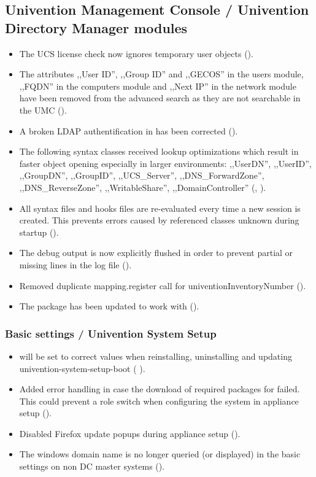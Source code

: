 \subsection{Univention Management Console / Univention Directory Manager modules}
\begin{itemize}
\item The UCS license check now ignores temporary user objects ().
\item The attributes ,,User ID'', ,,Group ID'' and ,,GECOS'' in the users module, ,,FQDN'' in the computers
  module and ,,Next IP'' in the network module have been removed from the advanced search as they
  are not searchable in the UMC ().
\item A broken LDAP authentification in  has been corrected ().
\item The following syntax classes received lookup optimizations
  which result in faster object opening especially in larger environments:
  ,,UserDN'', ,,UserID'', ,,GroupDN'', ,,GroupID'', ,,UCS\_Server'',
  ,,DNS\_ForwardZone'', ,,DNS\_ReverseZone'', ,,WritableShare'',
  ,,DomainController'' (, ).
\item All syntax files and hooks files are re-evaluated every time a new
  session is created. This prevents errors caused by referenced classes unknown
  during  startup
  ().
\item The debug output is now explicitly flushed in order to prevent
  partial or missing lines in the log file ().
\item Removed duplicate mapping.register call for univentionInventoryNumber ().
\item The package  has been updated to work with  ().
\end{itemize}

\subsubsection{Basic settings / Univention System Setup}
\begin{itemize}
\item {} will be set to correct values when reinstalling, 
uninstalling and updating univention-system-setup-boot ( ).
\item Added error handling in case the download of required packages for
 failed. This could prevent a
role switch when configuring the system in appliance setup ().
\item Disabled Firefox update popups during appliance setup ().

\item The windows domain name is no longer queried (or displayed) in the basic
settings on non  DC master systems ().

\end{itemize}

